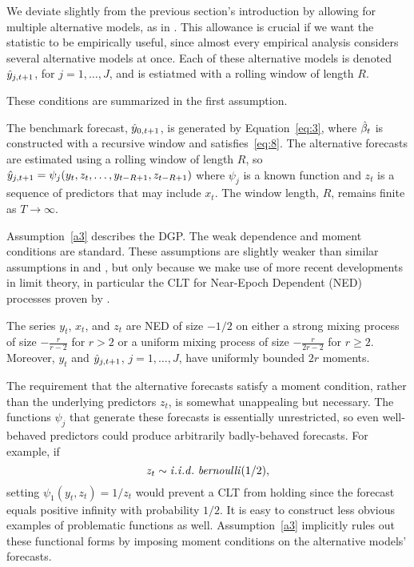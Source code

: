\documentclass[12pt,fleqn]{article}
\begin{document}
We deviate slightly from the previous section's introduction by
allowing for multiple alternative models, as in \cite{HuW:10}. This
allowance is crucial if we want the statistic to be empirically
useful, since almost every empirical analysis considers several
alternative models at once.  Each of these alternative models is
denoted $\hat{y}_{j,t+1}$, for $j = 1,\dots,J$, and is estiatmed with a
rolling window of length $R$.

These conditions are summarized in the first assumption.

\begin{asmp}\label{a1}%
  The benchmark forecast, $\hat{y}_{0,t+1}$, is generated by
  Equation~\eqref{eq:3}, where $\hat{\beta}_t$ is constructed with a recursive
  window and satisfies~\eqref{eq:8}. The alternative forecasts are
  estimated using a rolling window of length $R$, so $\hat{y}_{j,t+1} =
  \psi_j(y_t,z_t,\dots,y_{t-R+1}, z_{t-R+1})$ where $\psi_j$ is a
  known function and $z_t$ is a sequence of predictors that may
  include $x_t$. The window length, $R$, remains finite as $T \to
  \infty$.
\end{asmp}

Assumption~\ref{a3} describes the DGP. The weak dependence and moment
conditions are standard. These assumptions are slightly weaker than
similar assumptions in \citet{Wes:96} and \citet{Mcc:00}, but only
because we make use of more recent developments in limit theory, in
particular the CLT for Near-Epoch Dependent (NED) processes proven by
\cite{Jon:97}.

\begin{asmp}\label{a3}%
  The series $y_t$, $x_t$, and $z_t$ are NED of size $-1/2$ on either a
  strong mixing process of size $-\frac{r}{r-2}$ for $r>2$ or a uniform
  mixing process of size $-\frac{r}{2r-2}$ for $r \geq 2$. Moreover,
  $y_t$ and $\hat{y}_{j,t+1}$, $j = 1,\dots,J$, have uniformly bounded $2 r$
  moments.
\end{asmp}

The requirement that the alternative forecasts satisfy a moment
condition, rather than the underlying predictors $z_t$, is somewhat
unappealing but necessary. The functions $\psi_j$ that generate these
forecasts is essentially unrestricted, so even well-behaved predictors
could produce arbitrarily badly-behaved forecasts. For example, if
\begin{equation*}
  z_t \sim \mathit{i.i.d.}~\mathit{bernoulli}(1/2),
\end{equation*}
setting $\psi_1(y_t, z_t) = 1/z_t$ would prevent a CLT from holding
since the forecast equals positive infinity with probability $1/2$. It
is easy to construct less obvious examples of problematic functions as
well. Assumption~\ref{a3} implicitly rules out these functional forms
by imposing moment conditions on the alternative models' forecasts.
\end{document}
